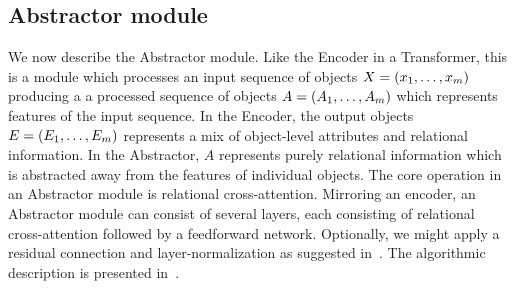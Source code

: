\subsection{Abstractor module}\label{ssec:abstractor_module}

We now describe the Abstractor module. Like the Encoder in a Transformer, this is a module which processes an input sequence of objects $X = \left(x_1, \ldots, x_m\right)$ producing a a processed sequence of objects $A = \left(A_1, \ldots, A_m\right)$ which represents features of the input sequence. In the Encoder, the output objects $E = \left(E_1, \ldots, E_m\right)$ represents a mix of object-level attributes and relational information. In the Abstractor, $A$ represents purely relational information which is abstracted away from the features of individual objects. The core operation in an Abstractor module is relational cross-attention. Mirroring an encoder, an Abstractor module can consist of several layers, each consisting of relational cross-attention followed by a feedforward network. Optionally, we might apply a residual connection and layer-normalization as suggested in~\citep{vaswani2017attention}. The algorithmic description is presented in~.

